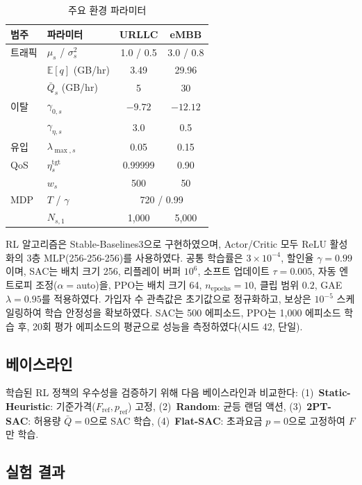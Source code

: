 \documentclass[10pt, twocolumn]{article}
\begin{document}
\begin{table}[h]
\centering
\caption{주요 환경 파라미터}
\label{tab:params}
\small
\begin{tabular}{@{}llcc@{}}
\toprule
범주 & 파라미터 & URLLC & eMBB \\
\midrule
트래픽 & $\mu_s$ / $\sigma_s^2$ & 1.0 / 0.5 & 3.0 / 0.8 \\
       & $\mathbb{E}[q]$ (GB/hr) & 3.49 & 29.96 \\
       & $\bar{Q}_s$ (GB/hr) & 5 & 30 \\
\midrule
이탈 & $\gamma_{0,s}$ & $-9.72$ & $-12.12$ \\
     & $\gamma_{\eta,s}$ & 3.0 & 0.5 \\
\midrule
유입 & $\lambda_{\max,s}$ & 0.05 & 0.15 \\
\midrule
QoS & $\eta_s^{\text{tgt}}$ & 0.99999 & 0.90 \\
    & $w_s$ & 500 & 50 \\
\midrule
MDP & $T$ / $\gamma$ & \multicolumn{2}{c}{720 / 0.99} \\
    & $N_{s,1}$ & 1{,}000 & 5{,}000 \\
\bottomrule
\end{tabular}
\end{table}

RL 알고리즘은 Stable-Baselines3으로 구현하였으며, Actor/Critic 모두 ReLU 활성화의 3층 MLP(256-256-256)를 사용하였다. 공통 학습률은 $3 \times 10^{-4}$, 할인율 $\gamma = 0.99$이며, SAC는 배치 크기 256, 리플레이 버퍼 $10^6$, 소프트 업데이트 $\tau = 0.005$, 자동 엔트로피 조정($\alpha=$auto)을, PPO는 배치 크기 64, $n_{\text{epochs}}=10$, 클립 범위 $0.2$, GAE $\lambda = 0.95$를 적용하였다. 가입자 수 관측값은 초기값으로 정규화하고, 보상은 $10^{-5}$ 스케일링하여 학습 안정성을 확보하였다. SAC는 500 에피소드, PPO는 1{,}000 에피소드 학습 후, 20회 평가 에피소드의 평균으로 성능을 측정하였다(시드 42, 단일).

\subsection{베이스라인}

학습된 RL 정책의 우수성을 검증하기 위해 다음 베이스라인과 비교한다:
(1)~\textbf{Static-Heuristic}: 기준가격($F_{\text{ref}}, p_{\text{ref}}$) 고정,
(2)~\textbf{Random}: 균등 랜덤 액션,
(3)~\textbf{2PT-SAC}: 허용량 $\bar{Q}=0$으로 SAC 학습,
(4)~\textbf{Flat-SAC}: 초과요금 $p=0$으로 고정하여 $F$만 학습.

\subsection{실험 결과}
\end{document}
